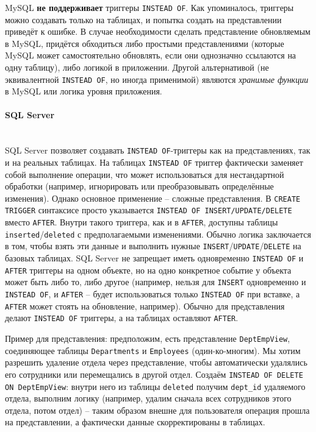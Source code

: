  MySQL \textbf{не поддерживает} триггеры \texttt{INSTEAD OF}. Как упоминалось, триггеры можно создавать только на таблицах, и попытка создать на представлении приведёт к ошибке. В случае необходимости сделать представление обновляемым в MySQL, придётся обходиться либо простыми представлениями (которые MySQL может самостоятельно обновлять, если они однозначно ссылаются на одну таблицу), либо логикой в приложении. Другой альтернативой (не эквивалентной \texttt{INSTEAD OF}, но иногда применимой) являются \textit{хранимые функции} в MySQL или логика уровня приложения.

\paragraph{\textbf{SQL Server}} ~\\

 SQL Server позволяет создавать \texttt{INSTEAD OF}-триггеры как на представлениях, так и на реальных таблицах. На таблицах \texttt{INSTEAD OF} триггер фактически заменяет собой выполнение операции, что может использоваться для нестандартной обработки (например, игнорировать или преобразовывать определённые изменения). Однако основное применение – сложные представления. В \texttt{CREATE TRIGGER} синтаксисе просто указывается \texttt{INSTEAD OF INSERT/UPDATE/DELETE} вместо \texttt{AFTER}. Внутри такого триггера, как и в \texttt{AFTER}, доступны таблицы \texttt{inserted}/\texttt{deleted} с предполагаемыми изменениями. Обычно логика заключается в том, чтобы взять эти данные и выполнить нужные \texttt{INSERT}/\texttt{UPDATE}/\texttt{DELETE} на базовых таблицах. SQL Server не запрещает иметь одновременно \texttt{INSTEAD OF} и \texttt{AFTER} триггеры на одном объекте, но на одно конкретное событие у объекта может быть либо то, либо другое (например, нельзя для \texttt{INSERT} одновременно и \texttt{INSTEAD OF}, и \texttt{AFTER} – будет использоваться только \texttt{INSTEAD OF} при вставке, а \texttt{AFTER} может стоять на обновление, например). Обычно для представления делают \texttt{INSTEAD OF} триггеры, а на таблицах оставляют \texttt{AFTER}.
 
 Пример для представления: предположим, есть представление \texttt{DeptEmpView}, соединяющее таблицы \texttt{Departments} и \texttt{Employees} (один-ко-многим). Мы хотим разрешить удаление отдела через представление, чтобы автоматически удалялись его сотрудники или перемещались в другой отдел. Создаём \texttt{INSTEAD OF DELETE ON DeptEmpView}: внутри него из таблицы \texttt{deleted} получим \texttt{dept\_id} удаляемого отдела, выполним логику (например, удалим сначала всех сотрудников этого отдела, потом отдел) – таким образом внешне для пользователя операция прошла на представлении, а фактически данные скорректированы в таблицах.

